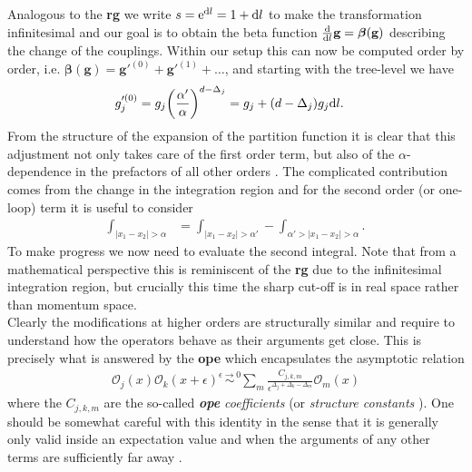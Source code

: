 \documentclass[english, parskip=full]{scrartcl}
\renewcommand{\gls}[1]{\textbf{#1}}
\newcommand{\trspace}{real space}
\newcommand{\tpspace}{momentum space}
\newcommand{\rgbeta}{\bm{\beta}}
\begin{document}
Analogous to the \tms{} \gls{rg} we write $s=\text{e}^{\text{d} l} = 1 + \text{d} l$ to make the transformation infinitesimal and our goal is to obtain the beta function $\frac{\d}{\d l} \textbf{g} = \rgbeta(\textbf{g})$ describing the change of the couplings.
Within our setup this can now be computed order by order, i.e. $\rgbeta(\textbf{g}) = \textbf{g}'^{(0)} + \textbf{g}'^{(1)} + \dots$, and starting with the tree-level we have \cite[]{Fradkin_2013}
\begin{align*}
g_j'^{(0)} &= g_j \kla*{\frac{\alpha'}{\alpha}}^{d-\Delta_j} = g_j + (d - \Delta_j) g_j \d l.
\end{align*}
From the structure of the expansion of the partition function it is clear that this adjustment not only takes care of the first order term, but also of the $\alpha$-dependence in the prefactors of all other orders \cite[]{Cardy_1996}.
The complicated contribution comes from the change in the integration region and for the second order (or one-loop) term it is useful to consider
\begin{align*}
\int_{|x_1-x_2|>\alpha} &= \int_{|x_1-x_2|>\alpha'} - \int_{\alpha'>|x_1-x_2|>\alpha}.
\end{align*}
To make progress we now need to evaluate the second integral.
Note that from a mathematical perspective this is reminiscent of the \tms{} \gls{rg} due to the infinitesimal integration region, but crucially this time the sharp cut-off is in \trspace{} rather than \tpspace{}.\\
Clearly the modifications at higher orders are structurally similar and require to understand how the operators behave as their arguments get close.
This is precisely what is answered by the \gls{ope} which encapsulates the asymptotic relation
\begin{align}
\mathcal{O}_j(x) \mathcal{O}_k(x+\epsilon) \overset{\epsilon\rightarrow 0}{\sim} \sum_m \frac{C_{j,k,m}}{\epsilon^{\Delta_j + \Delta_k - \Delta_m}} \mathcal{O}_m(x) \label{eqn:rg:OPE_def}
\end{align}
where the $C_{j,k,m}$ are the so-called \emph{\gls{ope} coefficients} \cite[]{Cardy_1996} (or \emph{structure constants} \cite[]{Fradkin_2013}). %
One should be somewhat careful with this identity in the sense that it is generally only valid inside an expectation value and when the arguments of any other terms are sufficiently far away \cite[]{Cardy_1996}.
\end{document}

